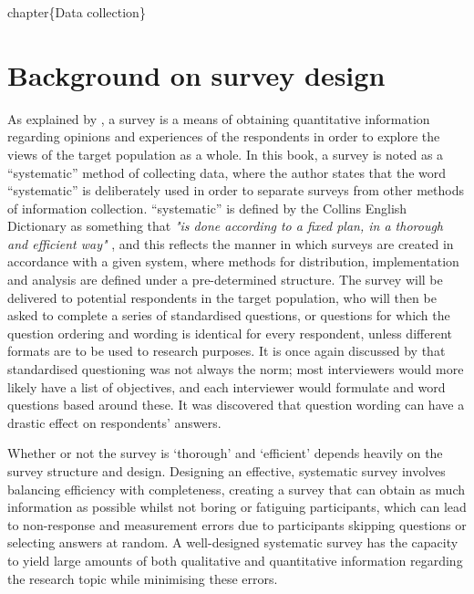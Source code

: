\documentclass[
  12pt,
  twocolumn]{book}
\author{}
\date{\vspace{-2.5em}}
\begin{document}
\frontmatter

\mainmatter
chapter\{Data collection\}

\section{Background on survey design}

As explained by \citet{wiley2004}, a survey is a means of obtaining
quantitative information regarding opinions and experiences of the
respondents in order to explore the views of the target population as a
whole. In this book, a survey is noted as a ``systematic'' method of
collecting data, where the author states that the word ``systematic'' is
deliberately used in order to separate surveys from other methods of
information collection. ``systematic'' is defined by the Collins English
Dictionary as something that
\textit{"is done according to a fixed plan, in a thorough and efficient way"}
\citep{collins-systematic}, and this reflects the manner in which
surveys are created in accordance with a given system, where methods for
distribution, implementation and analysis are defined under a
pre-determined structure. The survey will be delivered to potential
respondents in the target population, who will then be asked to complete
a series of standardised questions, or questions for which the question
ordering and wording is identical for every respondent, unless different
formats are to be used to research purposes. It is once again discussed
by \citet{wiley2004} that standardised questioning was not always the
norm; most interviewers would more likely have a list of objectives, and
each interviewer would formulate and word questions based around these.
It was discovered that question wording can have a drastic effect on
respondents' answers.

Whether or not the survey is `thorough' and `efficient' depends heavily
on the survey structure and design. Designing an effective, systematic
survey involves balancing efficiency with completeness, creating a
survey that can obtain as much information as possible whilst not boring
or fatiguing participants, which can lead to non-response and
measurement errors due to participants skipping questions or selecting
answers at random. A well-designed systematic survey has the capacity to
yield large amounts of both qualitative and quantitative information
regarding the research topic while minimising these errors.
\end{document}
